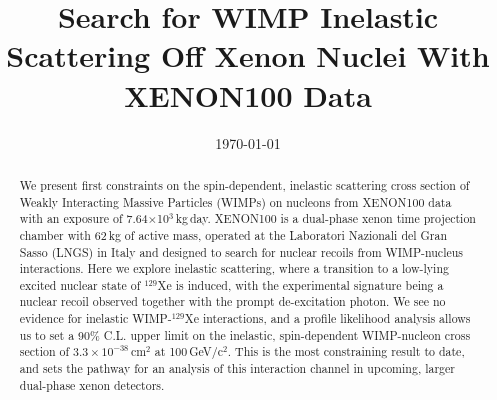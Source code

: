 \documentclass[%
 reprint,
superscriptaddress,
linenumbers,
 amsmath,amssymb,
 aps,
]{revtex4-1}
\begin{document}
\title{Search for WIMP Inelastic Scattering Off Xenon Nuclei With XENON100 Data}%

\noaffiliation

\date{\today}

\begin{abstract}
We present first constraints on the spin-dependent, inelastic scattering cross section of Weakly Interacting Massive Particles (WIMPs) on nucleons from XENON100 data with an exposure of 7.64$\times$10$^3$\,kg\,day. XENON100 is a dual-phase xenon time projection chamber with 62\,kg of active mass, operated at the Laboratori Nazionali del Gran Sasso (LNGS) in Italy and designed to search for nuclear recoils from WIMP-nucleus interactions. Here we explore inelastic scattering, where a transition to a low-lying excited nuclear state of $^{129}$Xe is induced, with the experimental signature being a nuclear recoil observed together with the prompt de-excitation photon. We see no evidence for inelastic WIMP-$^{129}$Xe interactions, and a profile likelihood analysis allows us to set a 90\% C.L. upper limit on the inelastic, spin-dependent WIMP-nucleon cross section of $3.3 \times 10^{-38}$\,cm$^{2}$  at 100\,GeV/c$^2$.  This is the most constraining result to date, and sets the pathway for an analysis of this interaction channel in upcoming, larger dual-phase xenon detectors.

\end{abstract}

\maketitle










 

\end{document}
